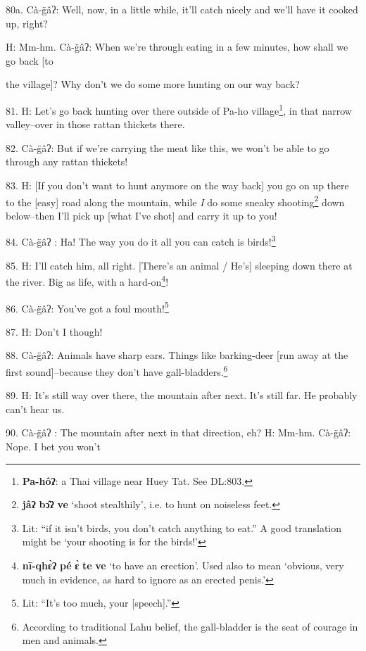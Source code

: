 
80a. Cà-g̈âʔ: Well, now, in a little while, it'll catch nicely and we'll have
it cooked up, right?

H: Mm-hm. Cà-g̈âʔ: When we're through eating in a few minutes, how shall we
go back [to

the village]? Why don't we do some more hunting on our way back?

81. H: Let's go back hunting over there outside of Pa-ho village\footnote{\textbf{Pa-hôʔ}: a Thai village near Huey Tat. See DL:803.}, in that narrow
valley--over in those rattan thickets there.

82. Cà-g̈âʔ: But if we're carrying the meat like this, we won't be able to
go through any rattan thickets!

83. H: [If you don't want to hunt anymore on the way back] you go on up there to
the [easy] road along the mountain, while \textit{I} do some sneaky shooting\footnote{\textbf{jâʔ} \textbf{bɔ̂ʔ} \textbf{ve} `shoot stealthily', i.e. to hunt on noiseless feet.}
down below--then I'll pick up [what I've shot] and carry it up to you!

84. Cà-g̈âʔ : Ha! The way you do it all you can catch is birds!\footnote{Lit: ``if it isn't birds, you don't catch anything to eat.'' A good translation might be `your shooting is for the birds!'}

85. H: I'll catch him, all right. [There's an animal / He's] sleeping down there
at the river. Big as life, with a hard-on\footnote{\textbf{nī-qhɛ̀ʔ} \textbf{pé} \textbf{ɛ̀} \textbf{te} \textbf{ve} `to have an erection'. Used also to mean `obvious, very much in evidence, as hard to ignore as an erected penis.'}!


86. Cà-g̈âʔ: You've got a foul mouth!\footnote{Lit: ``It's too much, your [speech].''}

87. H: Don't I though!

88. Cà-g̈âʔ: Animals have sharp ears. Things like barking-deer [run away at
the first sound]--because they don't have gall-bladders.\footnote{According to traditional Lahu belief, the gall-bladder is the seat of courage in men and animals.}

89. H: It's still way over there, the mountain after next. It's still far. He probably
can't hear us.

90. Cà-g̈âʔ : The mountain after next in that direction, eh? H: Mm-hm. Cà-g̈âʔ:
Nope. I bet you won't

